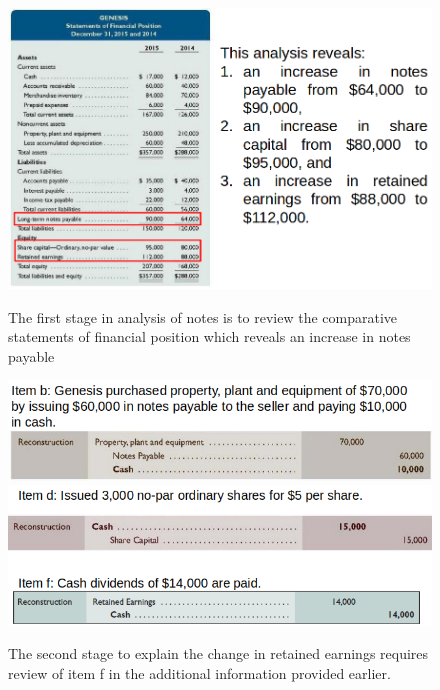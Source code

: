 \documentclass[../main.tex]{subfiles}
\begin{document}
	\begin{figure}[ht!]
		\centering
		\includegraphics[width=1\columnwidth]{images/c11/first_stage_finance.png}
		\caption{The first stage in analysis of notes is to review the 
		comparative statements of financial position which reveals an increase 
		in notes payable}
		\includegraphics[width=1\columnwidth]{images/c11/second_stage_finance.png}
		\includegraphics[width=1\columnwidth]{images/c11/second_stage_finance2.png}
		\caption{The second stage to explain the change in retained earnings 
		requires review of item f in the additional information provided 
		earlier.}

\end{figure}
\end{document}
